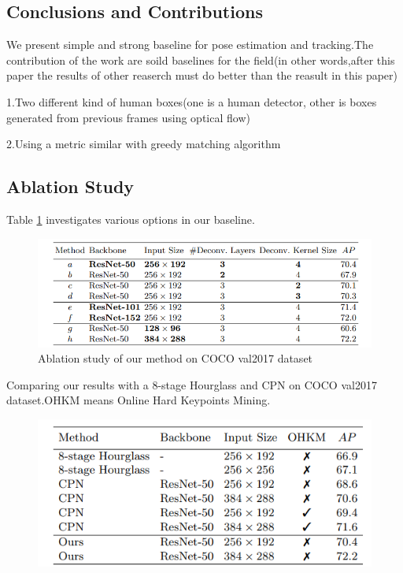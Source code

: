 \documentclass[11pt]{article}
\begin{document}
\subsection{Conclusions and Contributions}

We present simple and strong baseline for pose estimation and tracking.The contribution of the work are soild baselines for the field(in other words,after this paper the results of other reaserch must do better than the reasult in this paper)

1.Two different kind of human boxes(one is a human detector, other is boxes generated from previous frames using optical flow)

2.Using a metric similar with greedy matching algorithm
\subsection{Ablation Study}
Table \ref{tab1} investigates various options in our baseline.
\begin{figure}[H]
	\centering
	\includegraphics[scale = 0.7]{24}
	\caption{Ablation study of our method on COCO val2017 dataset}
	\label{tab1}
\end{figure}

Comparing our results with a 8-stage Hourglass and CPN on COCO val2017 dataset.OHKM means Online Hard Keypoints Mining.
\begin{figure}[H]
	\centering
	\includegraphics[scale = 0.7]{25}
\end{figure}
\end{document}
